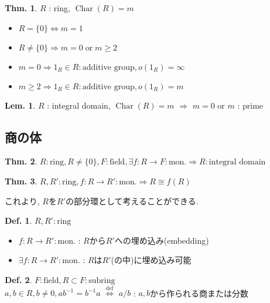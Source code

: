 \documentclass[uplatex,dvipdfmx,9pt]{beamer}
\newcommand{\defarrow}{\overset{\mathrm{def}}{\Leftrightarrow}}
\newcommand{\inverse}[1]{#1^{-1}}
\newcommand{\Char}[1]{\operatorname{Char}(#1)}
\newcommand{\mon}{\text{mon.}} %
\newcommand{\sscount}{\textsection \thesubsection}
\newcounter{textLemCount}
\newcounter{textExmCount}
\theoremstyle{definition} %
\newtheorem{defn}{Def.}[subsection] %
\newtheorem{thm}{Thm.}[subsection] %
\newtheorem{lemText}[textLemCount]{Lem.} %
\theoremstyle{example}
\begin{document}
\begin{frame}

  \begin{thm}
    $R$ : ring, $\Char{R} = m$
    \begin{itemize}
      \item $R = \{0\} \Leftrightarrow m = 1$
      \item $R \neq \{0\} \Rightarrow m = 0 \; \text{or} \; m \ge 2$
      \item $m = 0 \Rightarrow 1_R \in R : \text{additive group}, o(1_R) = \infty$
      \item $m \ge 2 \Rightarrow 1_R \in R : \text{additive group}, o(1_R) = m$
    \end{itemize}
  \end{thm}

  \begin{lemText}
    $R$ : integral domain, $\Char{R} = m$ $\Rightarrow$ $m = 0$ or $m$ : prime
  \end{lemText}

\end{frame}

\subsection{\sscount 商の体}
\setcounter{textExmCount}{0}

\begin{frame}

  \begin{thm}
    $R : \text{ring}, R \neq \{0\}, F : \text{field}, \exists f\colon R \to F : \mon \Rightarrow R : \text{integral domain}$
  \end{thm}

  \begin{thm}
    $R, R' : \text{ring}, f\colon R \to R' : \mon \Rightarrow R \cong f(R)$
  \end{thm}
  これより, $R$を$R'$の部分環として考えることができる.

  \begin{defn}
    $R, R' : \text{ring}$
    \begin{itemize}
      \item $f\colon R \to R' : \mon$ : $R$から$R'$への\alert{埋め込み(embedding)}
      \item $\exists f\colon R \to R' : \mon$ : $R$は$R'$(の中)に\alert{埋め込み可能}
    \end{itemize}
  \end{defn}

  \begin{defn}
    $F : \text{field}, R \subset F : \text{subring}$ \\
    $a, b \in R, b \neq 0, a\inverse{b} = \inverse{b}a$ $\defarrow$ $a/b$ : $a, b$から作られる商または分数
  \end{defn}

\end{frame}
\end{document}

